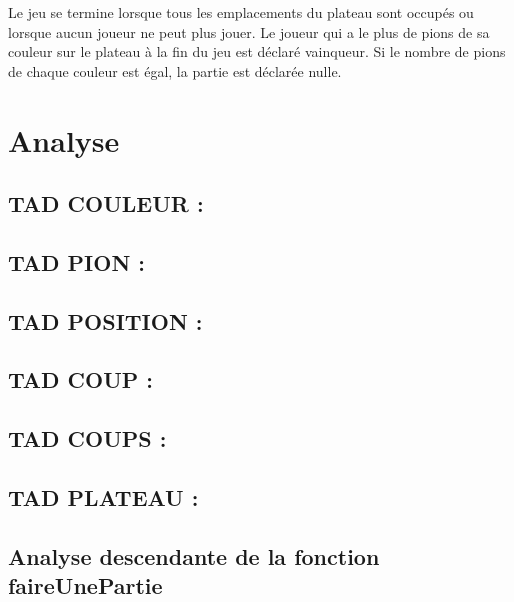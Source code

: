 \documentclass{article}
\begin{document}
Le jeu se termine lorsque tous les emplacements du plateau sont occupés ou lorsque aucun joueur ne peut plus jouer. Le joueur qui a le plus de pions de sa couleur sur le plateau à la fin du jeu est déclaré vainqueur. Si le nombre de pions de chaque couleur est égal, la partie est déclarée nulle.

\section{Analyse}

\subsection{TAD COULEUR :}


\subsection{TAD PION :}


\subsection{TAD POSITION :}


\subsection{TAD COUP :}


\subsection{TAD COUPS :}


\subsection{TAD PLATEAU :}



\subsection{Analyse descendante de la fonction faireUnePartie}
\end{document}
